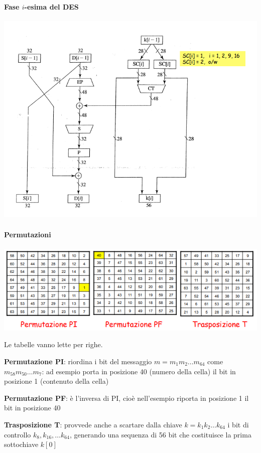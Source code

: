 \documentclass[10pt]{book}
\begin{document}
\paragraph{Fase $i$-esima del DES}
\begin{center}
	\includegraphics[scale=0.75]{9.png}
\end{center}
\paragraph{Permutazioni}
\begin{center}
	\includegraphics[scale=0.75]{10.png}
\end{center}
Le tabelle vanno lette per righe.
\begin{list}{}{}
	\item \textbf{Permutazione PI}: riordina i bit del messaggio $m = m_1 m_2\ldots m_{64}$ come $m_{58} m_{50}\ldots m_7$: ad esempio porta in posizione 40 (numero della cella) il bit in posizione 1 (contenuto della cella)
	\item \textbf{Permutazione PF}: è l'inversa di PI, cioè nell'esempio riporta in posizione 1 il bit in posizione 40
	\item \textbf{Trasposizione T}: provvede anche a scartare dalla chiave $k = k_1 k_2\ldots k_{64}$ i bit di controllo $k_8, k_16, \ldots k_64$, generando una sequenza di 56 bit che costituisce la prima sottochiave $k[0]$
\end{list}
\pagebreak
\end{document}
